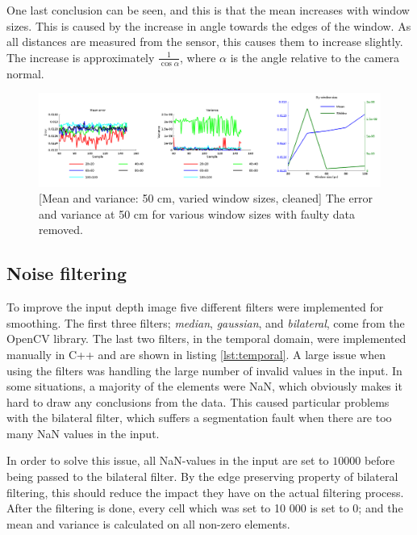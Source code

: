 \documentclass[11pt]{article}
\begin{document}
One last conclusion can be seen, and this is that the mean increases with window
sizes. This is caused by the increase in angle towards the edges of the
window. As all distances are measured from the sensor, this causes them to
increase slightly. The increase is approximately $\frac{1}{\cos \alpha}$, where
$\alpha$ is the angle relative to the camera normal.\par

\begin{figure}[ht]
  \centering
  \includegraphics[width=1\textwidth]{figures/plot2bywindowsize.png}
  [Mean and variance: 50 cm, varied window sizes,
  cleaned]{\label{fig:variedwindow2} The error and variance at 50 cm for various
    window sizes with faulty data removed.}
\end{figure}

\subsection{Noise filtering}

To improve the input depth image five different filters were implemented for
smoothing. The first three filters; \emph{median}, \emph{gaussian}, and
\emph{bilateral}, come from the OpenCV library. The last two filters, in the
temporal domain, were implemented manually in C++ and are shown in listing
\vref{lst:temporal}. A large issue when using the filters was handling the large
number of invalid values in the input. In some situations, a majority of the
elements were NaN, which obviously makes it hard to draw any conclusions from
the data. This caused particular problems with the bilateral filter, which
suffers a segmentation fault when there are too many NaN values in the
input. \par




In order to solve this issue, all NaN-values in the input are set to $10000$
before being passed to the bilateral filter. By the edge preserving property of
bilateral filtering, this should reduce the impact they have on the actual
filtering process. After the filtering is done, every cell which was set to 10
000 is set to 0; and the mean and variance is calculated on all non-zero
elements. \par
\end{document}
